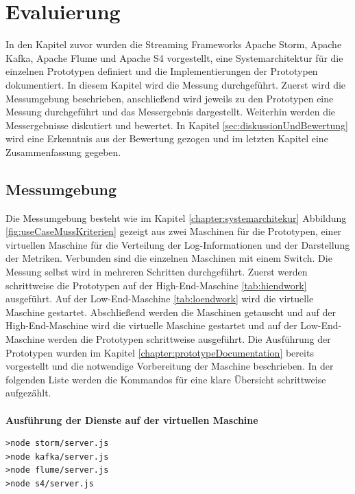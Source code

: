 \chapter{Evaluierung}
\label{chapter:evaluierung}

In den Kapitel zuvor wurden die Streaming Frameworks Apache Storm, Apache Kafka, Apache Flume und Apache S4 vorgestellt, eine Systemarchitektur für die einzelnen Prototypen definiert und die Implementierungen der Prototypen dokumentiert. In diesem Kapitel wird die Messung durchgeführt. Zuerst wird die Messumgebung beschrieben, anschließend wird jeweils zu den Prototypen eine Messung durchgeführt und das Messergebnis dargestellt. Weiterhin werden die Messergebnisse diskutiert und bewertet. In Kapitel \ref{sec:diskussionUndBewertung} wird eine Erkenntnis aus der Bewertung gezogen und im letzten Kapitel eine Zusammenfassung gegeben.

\section{Messumgebung}
\label{sec:aufbauMessumgebung}

Die Messumgebung besteht wie im Kapitel \ref{chapter:systemarchitekur} Abbildung \ref{fig:useCaseMussKriterien} gezeigt aus zwei Maschinen für die Prototypen, einer virtuellen Maschine für die Verteilung der Log-Informationen und der Darstellung der Metriken. Verbunden sind die einzelnen Maschinen mit einem Switch. Die Messung selbst wird in mehreren Schritten durchgeführt. Zuerst werden schrittweise die Prototypen auf der High-End-Maschine \ref{tab:hiendwork} ausgeführt. Auf der Low-End-Maschine \ref{tab:loendwork} wird die virtuelle Maschine gestartet. Abschließend werden die Maschinen getauscht und auf der High-End-Maschine wird die virtuelle Maschine gestartet und auf der Low-End-Maschine werden die Prototypen schrittweise ausgeführt. Die Ausführung der Prototypen wurden im Kapitel \ref{chapter:prototypeDocumentation} bereits vorgestellt und die notwendige Vorbereitung der Maschine beschrieben. In der folgenden Liste werden die Kommandos für eine klare Übersicht schrittweise aufgezählt. \\\\

\textbf{Ausführung der Dienste auf der virtuellen Maschine}

\begin{verbatim}
>node storm/server.js
>node kafka/server.js
>node flume/server.js
>node s4/server.js
\end{verbatim}



